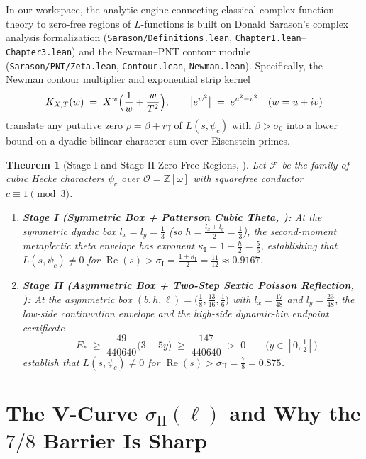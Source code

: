 \documentclass[11pt]{amsart}
\newtheorem{theorem}{Theorem}[section]
\theoremstyle{definition}
\theoremstyle{remark}
\begin{document}
In our workspace, the analytic engine connecting classical complex function theory to zero-free regions of $L$-functions is built on Donald Sarason's complex analysis formalization (\texttt{Sarason/Definitions.lean}, \texttt{Chapter1.lean}--\texttt{Chapter3.lean}) and the Newman--PNT contour module (\texttt{Sarason/PNT/Zeta.lean}, \texttt{Contour.lean}, \texttt{Newman.lean}). Specifically, the Newman contour multiplier and exponential strip kernel
\[
  K_{X,T}(w) \;=\; X^w \Bigl(\frac{1}{w} + \frac{w}{T^2}\Bigr),
  \qquad
  \bigl|e^{w^2}\bigr| \;=\; e^{u^2 - v^2} \quad (w = u + iv)
\]
translate any putative zero $\rho = \beta + i\gamma$ of $L(s, \psi_c)$ with $\beta > \sigma_0$ into a lower bound on a dyadic bilinear character sum over Eisenstein primes.

\begin{theorem}[Stage I and Stage II Zero-Free Regions, \cite{OAI26a,OAI26b}]\label{thm:main}
Let $\mathcal{F}$ be the family of cubic Hecke characters $\psi_c$ over $\mathcal{O} = \mathbb{Z}[\omega]$ with squarefree conductor $c \equiv 1 \pmod{3}$.
\begin{enumerate}
  \item \textbf{Stage I (Symmetric Box + Patterson Cubic Theta, \cite{OAI26b}):} At the symmetric dyadic box $l_x = l_y = \frac{1}{3}$ (so $h = \frac{l_x + l_y}{2} = \frac{1}{3}$), the second-moment metaplectic theta envelope has exponent $\kappa_{\mathrm{I}} = 1 - \frac{h}{2} = \frac{5}{6}$, establishing that $L(s, \psi_c) \ne 0$ for $\operatorname{Re}(s) > \sigma_{\mathrm{I}} = \frac{1 + \kappa_{\mathrm{I}}}{2} = \frac{11}{12} \approx 0.9167$.
  \item \textbf{Stage II (Asymmetric Box + Two-Step Sextic Poisson Reflection, \cite{OAI26a}):} At the asymmetric box $(b, h, \ell) = \bigl(\frac{1}{8}, \frac{13}{16}, \frac{1}{6}\bigr)$ with $l_x = \frac{17}{48}$ and $l_y = \frac{23}{48}$, the low-side continuation envelope and the high-side dynamic-bin endpoint certificate
  \[
    -E_* \;\ge\; \frac{49}{440640}\bigl(3 + 5y\bigr) \;\ge\; \frac{147}{440640} \;>\; 0 \qquad \bigl(y \in [0, \tfrac{1}{2}]\bigr)
  \]
  establish that $L(s, \psi_c) \ne 0$ for $\operatorname{Re}(s) > \sigma_{\mathrm{II}} = \frac{7}{8} = 0.875$.
\end{enumerate}
\end{theorem}

\section{The V-Curve $\sigma_{\mathrm{II}}(\ell)$ and Why the $7/8$ Barrier Is Sharp}
\end{document}

